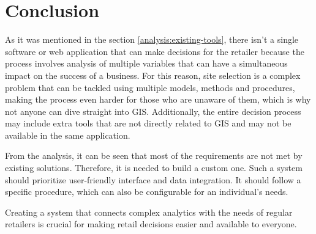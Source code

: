 \section{Conclusion}

As it was mentioned in the section \ref{analysis:existing-tools}, there isn't a single software or web application that can make decisions for the retailer because the process involves analysis of multiple variables that can have a simultaneous impact on the success of a business. For this reason, site selection is a complex problem that can be tackled using multiple models, methods and procedures, making the process even harder for those who are unaware of them, which is why not anyone can dive straight into GIS. Additionally, the entire decision process may include extra tools that are not directly related to GIS and may not be available in the same application.

From the analysis, it can be seen that most of the requirements are not met by existing solutions. Therefore, it is needed to build a custom one. Such a system should prioritize user-friendly interface and data integration. It should follow a specific procedure, which can also be configurable for an individual's needs. 

Creating a system that connects complex analytics with the needs of regular retailers is crucial for making retail decisions easier and available to everyone.